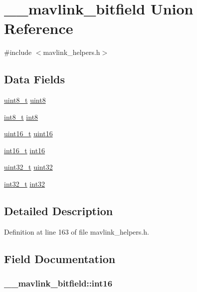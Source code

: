 \hypertarget{union____mavlink__bitfield}{\section{\-\_\-\-\_\-mavlink\-\_\-bitfield Union Reference}
\label{union____mavlink__bitfield}
}


{\ttfamily \#include $<$mavlink\-\_\-helpers.\-h$>$}

\subsection*{Data Fields}
\begin{DoxyCompactItemize}
\item 
\hyperlink{stdint_8h_aba7bc1797add20fe3efdf37ced1182c5}{uint8\-\_\-t} \hyperlink{union____mavlink__bitfield_ade669a5f63c53f0d61f636eff94417c0}{uint8}
\item 
\hyperlink{stdint_8h_ad566f6541e98b74246db1a3a3a85ad49}{int8\-\_\-t} \hyperlink{union____mavlink__bitfield_a50a846d427d7a1d7dc79235c87597622}{int8}
\item 
\hyperlink{stdint_8h_a273cf69d639a59973b6019625df33e30}{uint16\-\_\-t} \hyperlink{union____mavlink__bitfield_a0ca76ce4a09ee26387e50b6702c17894}{uint16}
\item 
\hyperlink{stdint_8h_aa343fa3b3d06292b959ffdd4c4703b06}{int16\-\_\-t} \hyperlink{union____mavlink__bitfield_a99cd7f966d8a59b29d05197b39c5b229}{int16}
\item 
\hyperlink{stdint_8h_a435d1572bf3f880d55459d9805097f62}{uint32\-\_\-t} \hyperlink{union____mavlink__bitfield_ab43ed56310c2d778ebaa7a5a21cb6587}{uint32}
\item 
\hyperlink{group___n_a_m_e_gafd12020da5a235dfcf0c3c748fb5baed}{int32\-\_\-t} \hyperlink{union____mavlink__bitfield_a07bd702e8b91679a25e632ad90d0a1ec}{int32}
\end{DoxyCompactItemize}


\subsection{Detailed Description}


Definition at line 163 of file mavlink\-\_\-helpers.\-h.



\subsection{Field Documentation}
\hypertarget{union____mavlink__bitfield_a99cd7f966d8a59b29d05197b39c5b229}{
\subsubsection[{int16}]{ \-\_\-\-\_\-mavlink\-\_\-bitfield\-::int16}}\label{union____mavlink__bitfield_a99cd7f966d8a59b29d05197b39c5b229}


